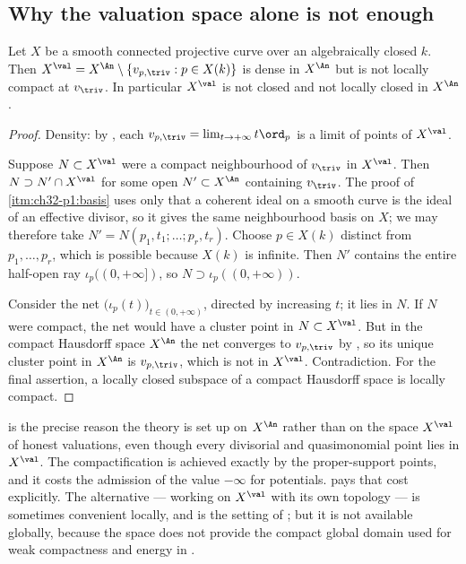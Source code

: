 \subsection{Why the valuation space alone is not enough}
\label{sec:ch32-not-locally-compact}

\begin{proposition}
\label{prop:ch32-xval-not-locally-compact}
Let $X$ be a smooth connected projective curve over an algebraically
closed $k$.  Then $X^{\val}=X^{\An}\setminus\{v_{p,\triv}:p\in X(k)\}$
is dense in $X^{\An}$ but is not locally compact at $v_\triv$.  In
particular $X^{\val}$ is not closed and not locally closed in
$X^{\An}$.
\end{proposition}

\begin{proof}
Density: by , each
$v_{p,\triv}=\lim_{t\to+\infty}t\ord_p$ is a limit of points of
$X^{\val}$.

Suppose $N\subset X^{\val}$ were a compact neighbourhood of $v_\triv$ in
$X^{\val}$.  Then $N\supset N'\cap X^{\val}$ for some open
$N'\subset X^{\An}$ containing $v_\triv$.  The proof of
\,\cref{itm:ch32-p1:basis} uses only that a
coherent ideal on a smooth curve is the ideal of an effective divisor, so it
gives the same neighbourhood basis on $X$; we may therefore take
$N'=N(p_1,t_1;\ldots;p_r,t_r)$.  Choose $p\in X(k)$ distinct from
$p_1,\ldots,p_r$, which is possible because $X(k)$ is infinite.  Then
$N'$ contains the entire half-open ray $\iota_p((0,+\infty])$, so
$N\supset\iota_p((0,+\infty))$.

Consider the net $\bigl(\iota_p(t)\bigr)_{t\in(0,+\infty)}$, directed by
increasing $t$; it lies in $N$.  If $N$ were compact, the net would
have a cluster point in $N\subset X^{\val}$.  But in the compact
Hausdorff space $X^{\An}$ the net converges to $v_{p,\triv}$ by
, so its unique cluster point in $X^{\An}$
is $v_{p,\triv}$, which is not in $X^{\val}$.  Contradiction.  For the
final assertion, a locally closed subspace of a compact Hausdorff space is
locally compact.
\end{proof}

\begin{remark}
\label{rem:ch32-moral-of-the-line}
 is the precise reason the theory
is set up on $X^{\An}$ rather than on the space $X^{\val}$ of honest
valuations, even though every divisorial and quasimonomial point lies in
$X^{\val}$.  The compactification is achieved exactly by the
proper-support points, and it costs the admission of the value $-\infty$
for potentials.   pays that cost explicitly.
The alternative --- working on $X^{\val}$ with its own topology --- is
sometimes convenient locally, and is the setting of
; but it is not available globally, because
the space does not provide the compact global domain used for weak
compactness and energy in .
\end{remark}

